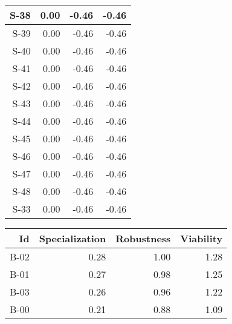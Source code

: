 \begin{tabular}{ | r | r | r | r | }
    \hline
                  S-38  &            0.00  &           -0.46  &           -0.46  \\
    \hline
                  S-39  &            0.00  &           -0.46  &           -0.46  \\
    \hline
                  S-40  &            0.00  &           -0.46  &           -0.46  \\
    \hline
                  S-41  &            0.00  &           -0.46  &           -0.46  \\
    \hline
                  S-42  &            0.00  &           -0.46  &           -0.46  \\
    \hline
                  S-43  &            0.00  &           -0.46  &           -0.46  \\
    \hline
                  S-44  &            0.00  &           -0.46  &           -0.46  \\
    \hline
                  S-45  &            0.00  &           -0.46  &           -0.46  \\
    \hline
                  S-46  &            0.00  &           -0.46  &           -0.46  \\
    \hline
                  S-47  &            0.00  &           -0.46  &           -0.46  \\
    \hline
                  S-48  &            0.00  &           -0.46  &           -0.46  \\
    \hline
                  S-33  &            0.00  &           -0.46  &           -0.46  \\
    \hline
\end{tabular}


\begin{tabular}{ | r | r | r | r | }
    \hline
                    Id  &  Specialization  &      Robustness  &       Viability  \\
    \hline
    \hline
                  B-02  &            0.28  &            1.00  &            1.28  \\
    \hline
                  B-01  &            0.27  &            0.98  &            1.25  \\
    \hline
                  B-03  &            0.26  &            0.96  &            1.22  \\
    \hline
                  B-00  &            0.21  &            0.88  &            1.09  \\
    \hline
\end{tabular}


